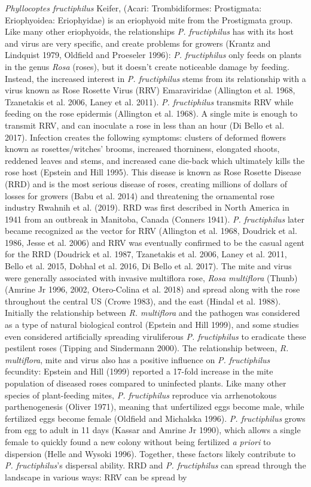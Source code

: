 \documentclass[12pt,final,CPage]{ufthesis}
\begin{document}
{  \emph{Phyllocoptes fructiphilus} Keifer, (Acari: Trombidiformes: Prostigmata: Eriophyoidea: Eriophyidae) is an eriophyoid mite from the Prostigmata group. Like many other eriophyoids, the relationships \emph{P. fructiphilus} has with its host and virus are very specific, and create problems for growers (Krantz and Lindquist 1979, Oldfield and Proeseler 1996): \emph{P. fructiphilus} only feeds on plants in the genus \emph{Rosa} (roses), but it doesn't create noticeable damage by feeding. Instead, the increased interest in \emph{P. fructiphilus} stems from its relationship with a virus known as Rose Rosette Virus (RRV) Emaraviridae (Allington et al. 1968, Tzanetakis et al. 2006, Laney et al. 2011). \emph{P. fructiphilus} transmits RRV while feeding on the rose epidermis (Allington et al. 1968). A single mite is enough to transmit RRV, and can inoculate a rose in less than an hour (Di Bello et al. 2017). Infection creates the following symptoms: clusters of deformed flowers known as rosettes/witches' brooms, increased thorniness, elongated shoots, reddened leaves and stems, and increased cane die-back which ultimately kills the rose host (Epstein and Hill 1995). This disease is known as Rose Rosette Disease (RRD) and is the most serious disease of roses, creating millions of dollars of losses for growers (Babu et al. 2014) and threatening the ornamental rose industry Rwahnih et al. (2019). RRD was first described in North America in 1941 from an outbreak in Manitoba, Canada (Conners 1941). \emph{P. fructiphilus} later became recognized as the vector for RRV (Allington et al. 1968, Doudrick et al. 1986, Jesse et al. 2006) and RRV was eventually confirmed to be the casual agent for the RRD (Doudrick et al. 1987, Tzanetakis et al. 2006, Laney et al. 2011, Bello et al. 2015, Dobhal et al. 2016, Di Bello et al. 2017). The mite and virus were generally associated with invasive multiflora rose, \emph{Rosa multiflora} (Thunb) (Amrine Jr 1996, 2002, Otero-Colina et al. 2018) and spread along with the rose throughout the central US (Crowe 1983), and the east (Hindal et al. 1988). Initially the relationship between \emph{R. multiflora} and the pathogen was considered as a type of natural biological control (Epstein and Hill 1999), and some studies even considered artificially spreading viruliferous \emph{P. fructiphilus} to eradicate these pestilent roses (Tipping and Sindermann 2000). The relationship between, \emph{R. multiflora}, mite and virus also has a positive influence on \emph{P. fructiphilus} fecundity: Epstein and Hill (1999) reported a 17-fold increase in the mite population of diseased roses compared to uninfected plants. Like many other species of plant-feeding mites, \emph{P. fructiphilus} reproduce via arrhenotokous parthenogenesis (Oliver 1971), meaning that unfertilized eggs become male, while fertilized eggs become female (Oldfield and Michalska 1996). \emph{P. fructiphilus} grows from egg to adult in 11 days (Kassar and Amrine Jr 1990), which allows a single female to quickly found a new colony without being fertilized \emph{a priori} to dispersion (Helle and Wysoki 1996). Together, these factors likely contribute to \emph{P. fructiphilus}'s dispersal ability. RRD and \emph{P. fructiphilus} can spread through the landscape in various ways: RRV can be spread by }
\end{document}
